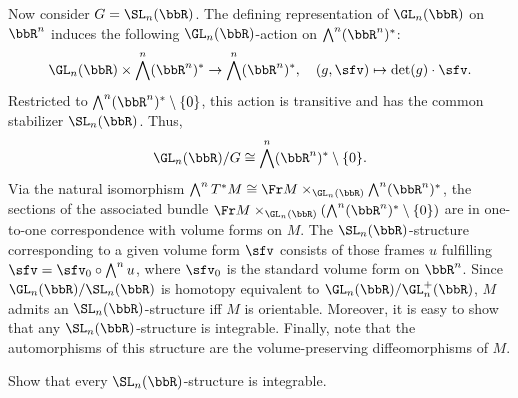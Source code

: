 \begin{example}
    Now consider $G=\SL_n(\bbR)$. The defining representation of $\GL_n(\bbR)$ on $\bbR^n$ induces the following $\GL_n(\bbR)$-action on $\bigwedge^n(\bbR^n)^\ast$: 
    \[\GL_n(\bbR)\times \bigwedge^n(\bbR^n)^\ast\to  \bigwedge^n(\bbR^n)^\ast,\quad (g,\sfv)\mapsto \det(g)\cdot\sfv.\]
    Restricted to $\bigwedge^n(\bbR^n)^\ast\setminus\{0\}$, this action is transitive and has the common stabilizer $\SL_n(\bbR)$. Thus, 
    \[\GL_n(\bbR)\slash G\cong \bigwedge^n(\bbR^n)^\ast\setminus\{0\}.\]
    Via the natural isomorphism $\bigwedge^n T^\ast M\cong \Fr M\times_{\GL_n(\bbR)}\bigwedge^n(\bbR^n)^\ast$, the sections of the associated bundle $\Fr M\times_{\GL_n(\bbR)} \left(\bigwedge^n(\bbR^n)^\ast\setminus\{0\}\right)$ are in one-to-one correspondence with volume forms on $M$. The $\SL_n(\bbR)$-structure corresponding to a given volume form $\sfv$ consists of those frames $u$ fulfilling $\sfv=\sfv_0\circ \bigwedge^n u$, where $\sfv_0$ is the standard volume form on $\bbR^n$. Since $\GL_n(\bbR)\slash\SL_n(\bbR)$ is homotopy equivalent to $\GL_n(\bbR)\slash \GL_n^+(\bbR)$, $M$ admits an $\SL_n(\bbR)$-structure iff $M$ is orientable. Moreover, it is easy to show that any $\SL_n(\bbR)$-structure is integrable. Finally, note that the automorphisms of this structure are the volume-preserving diffeomorphisms of $M$.
\end{example}
\begin{xca}
    Show that every $\SL_n(\bbR)$-structure is integrable.
\end{xca}


